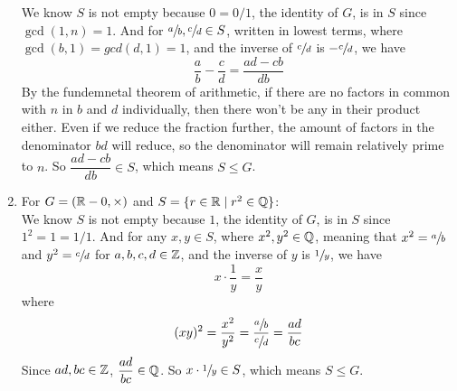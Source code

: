 \documentclass[12pt]{article}
\begin{document}
\begin{enumerate}[label=\textbf{\alph*.}]
            We know $S$ is not empty because $0 = 0/1$,
            the identity of $G$, is in $S$ since $\gcd(1, n) = 1$.
            And for $\sfrac{a}{b}, \sfrac{c}{d} \in S$,
            written in lowest terms,
            where $\gcd(b, 1) = gcd (d, 1) = 1$,
            and the inverse of $\sfrac{c}{d}$ is $-\sfrac{c}{d}$,
            we have \[\dfrac{a}{b} - \dfrac{c}{d} = \dfrac{ad - cb}{db}\]
            By the fundemnetal theorem of arithmetic,
            if there are no factors in common with $n$ in $b$ and $d$
            individually,
            then there won't be any in their product either.
            Even if we reduce the fraction further,
            the amount of factors in the denominator $bd$ will reduce,
            so the denominator will remain relatively prime to $n$.
            So $\dfrac{ad - cb}{db} \in S$,
            which means $S \leqslant G$. 
        \item 
            For $G = (\mathbb{R} - {0}, \times)$
            and $S = \{r \in \mathbb{R} \mid r^2 \in \mathbb{Q}\}$: \\
            We know $S$ is not empty because $1$,
            the identity of $G$, is in $S$ since $1^2 = 1 = 1/1$.
            And for any $x, y \in S$,
            where $x^2, y^2 \in \mathbb{Q}$,
            meaning that $x^2 = \sfrac{a}{b}$ and $y^2 = \sfrac{c}{d}$ for
            $a, b, c, d \in \mathbb{Z}$,
            and the inverse of $y$ is $\sfrac{1}{y}$,
            we have \[x \cdot \dfrac{1}{y} = \dfrac{x}{y}\]
            where \[(xy)^2 = \dfrac{x^2}{y^2}
            = \dfrac{\sfrac{a}{b}}{\sfrac{c}{d}}
            = \dfrac{ad}{bc}\]
            Since $ad, bc \in \mathbb{Z}$, $\dfrac{ad}{bc} \in \mathbb{Q}$.
            So $x \cdot \sfrac{1}{y} \in S$,
            which means $S \leqslant G$. 
    \end{enumerate}
\end{document}
